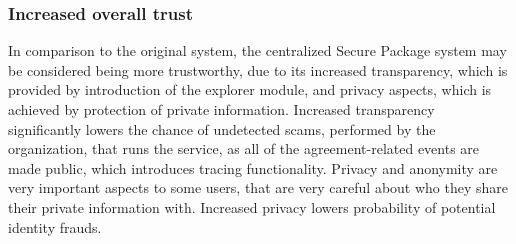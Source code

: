 \subsubsection{Increased overall trust}

In comparison to the original system, the centralized Secure Package system may be considered being more trustworthy, due to its increased transparency, which is provided by introduction of the explorer module, and privacy aspects, which is achieved by protection of private information. Increased transparency significantly lowers the chance of undetected scams, performed by the organization, that runs the service, as all of the agreement-related events are made public, which introduces tracing functionality. Privacy and anonymity are very important aspects to some users, that are very careful about who they share their private information with. Increased privacy lowers probability of potential identity frauds.

